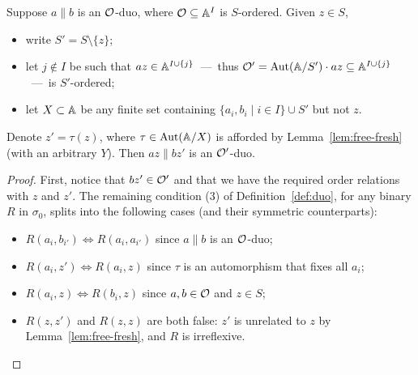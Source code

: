 \begin{lemma}\label{lem:cog-fresh-single}
    Suppose $a\parallel b$ is an $\cal O$-duo, where $\cal O \subseteq \A^I$ is $S$-ordered.
    Given $z \in S$, 
    \begin{itemize}
        \item write $S' = S \setminus \{z\}$;
        \item let $j \not\in I$ be such that $a z \in \A^{I \cup \{j\}}$~---~thus ${\cal O'}=\Aut(\A / S') \cdot az \subseteq \A^{I \cup \{j\}}$~---~is $S'$-ordered;
        \item let $X \subset \A$ be any finite set containing $\{a_i, b_i \mid i \in I\} \cup S'$ but not $z$.
    \end{itemize}
    Denote $z'=\tau(z)$, where $\tau \in \Aut(\A/X)$ is afforded by Lemma~\ref{lem:free-fresh} (with an arbitrary $Y$). Then $az \parallel bz'$ is an $\cal O'$-duo.
\end{lemma}
\begin{proof}
    First, notice that $bz'\in {\cal O}'$ and that we have the required order relations with $z$ and $z'$. 
    The remaining condition (3) of Definition~\ref{def:duo}, for any binary $R$ in $\sigma_0$, splits into the following cases (and their symmetric counterparts):
\begin{itemize}
\item $R(a_i,b_{i'})\iff R(a_i,a_{i'})$ since $a \parallel b$ is an $\cal O$-duo;
\item $R(a_i,z')\iff R(a_i,z)$ since $\tau$ is an automorphism that fixes all $a_i$;
\item $R(a_i,z)\iff R(b_i,z)$ since $a, b \in \cal O$ and $z\in S$;
\item $R(z,z')$ and $R(z,z)$ are both false: $z'$ is unrelated to $z$ by Lemma~\ref{lem:free-fresh}, and $R$ is irreflexive. \qedhere
\end{itemize}
\end{proof}

